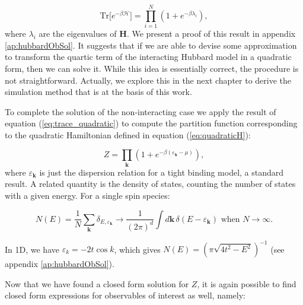 \begin{equation}\label{eq:trace_quadratic}
\text{Tr} \big[ e^{-\beta \mathcal{H} } \big] = \prod_{i=1}^N ( 1 + e^{-\beta \lambda_i } ) ,
\end{equation}
where $\lambda_i$ are the eigenvalues of $\bm H$. We present a proof of this result in appendix \ref{ap:hubbardObSol}.
It suggests that if we are able to devise some approximation to transform the quartic term of the interacting Hubbard model in a quadratic form, then we can solve it.
While this idea is essentially correct, the procedure is not straightforward.
Actually, we explore this in the next chapter to derive the simulation method that is at the basis of this work.

To complete the solution of the non-interacting case we apply the result of equation (\ref{eq:trace_quadratic}) to compute the partition function corresponding to the quadratic Hamiltonian defined in equation (\ref{eq:quadraticH}):

\begin{equation}
Z = \prod_{\bm k} ( 1 + e^{-\beta (\varepsilon_{\bm k} - \mu )} ) ,
\end{equation}
where $\varepsilon_{\bm k}$ is just the dispersion relation for a tight binding model, a standard result.
A related quantity is the density of states, counting the number of states with a given energy. For a single spin species:

\begin{equation}
N ( E ) = \frac{1}{N} \sum_{\bm k} \delta_{E,\varepsilon_{\bm k}} \rightarrow \frac{1}{(2\pi)^d} \int d\bm k \, \delta ( E - \varepsilon_{\bm k})\,\, \text{when}\,\, N\rightarrow \infty.
\end{equation}

In \acs{1D}, we have $\varepsilon_{k} = - 2 t \cos k$, which gives $N(E) = ( \pi \sqrt{ 4 t^2 - E^2 } )^{-1}$ (see appendix \ref{ap:hubbardObSol}).

Now that we have found a closed form solution for $Z$, it is again possible to find closed form expressions for observables of interest as well, namely:

